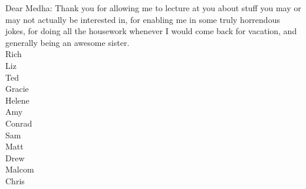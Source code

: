 Dear Medha: Thank you for allowing me to lecture at you about stuff you may or may not actually be interested in, for enabling me in some truly horrendous jokes, for doing all the housework whenever I would come back for vacation, and generally being an awesome sister. \\

Rich\\

Liz\\

Ted\\

Gracie\\

Helene\\

Amy\\

Conrad\\

Sam\\

Matt\\

Drew\\

Malcom\\

Chris\\






